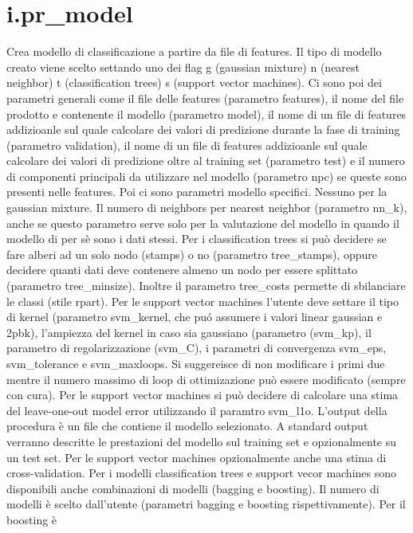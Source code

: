 \section{i.pr\_model}
Crea modello di classificazione a partire da file di features. Il tipo
di modello creato viene scelto settando uno dei flag g (gaussian mixture) n (nearest
neighbor) t (classification trees) s (support vector machines). Ci
sono poi dei parametri generali come il file delle features (parametro
features), il nome del file prodotto e contenente il modello
(parametro model), il nome di un file di features addizioanle sul
quale calcolare dei valori di predizione durante la fase di training
(parametro validation), il nome di un file di features addizioanle sul
quale calcolare dei valori di predizione oltre al training set
(parametro test) e il numero di componenti principali da utilizzare
nel modello (parametro npc) se queste sono presenti nelle features.
Poi ci sono parametri modello specifici. Nessuno per la gaussian
mixture. Il numero di neighbors per nearest neighbor (parametro
nn\_k), anche se questo parametro serve solo per la valutazione del
modello in quando il modello di per s\`{e} sono i dati stessi. Per i
classification trees si pu\`{o} decidere se fare alberi ad un solo
nodo (stamps) o no (parametro tree\_stamps), oppure decidere quanti
dati deve contenere almeno un nodo per essere splittato (parametro
tree\_minsize). Inoltre il parametro tree\_costs permette di
sbilanciare le classi (stile rpart). Per le support vector machines
l'utente deve settare il tipo di kernel (parametro svm\_kernel, che
pu\'o assumere i valori linear gaussian e 2pbk), l'ampiezza del kernel
in caso sia gaussiano (parametro (svm\_kp), il parametro di
regolarizzazione (svm\_C), i parametri di convergenza svm\_eps,
svm\_tolerance e svm\_maxloops. Si suggereisce di non modificare i
primi due mentre il numero massimo di loop di ottimizazione pu\`{o}
essere modificato (sempre con cura). Per le support vector machines si
pu\`{o} decidere di calcolare una stima del leave-one-out model error
utilizzando il paramtro svm\_l1o. L'output della procedura \`{e} un
file che contiene il modello selezionato. A standard output verranno
descritte le prestazioni del modello sul training set e opzionalmente
su un test set. Per le support vector machines opzionalmente anche una
stima di cross-validation. Per i modelli classification trees e
support vecor machines sono disponibili anche combinazioni di modelli
(bagging e boosting). Il numero di modelli \`{e} scelto dall'utente
(parametri bagging e boosting rispettivamente). Per il boosting \`{e}
